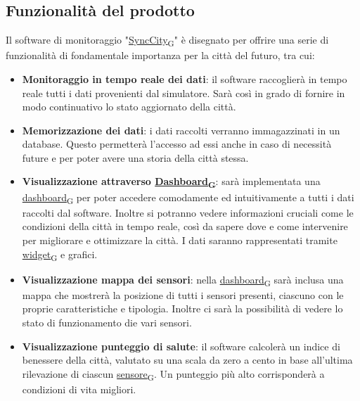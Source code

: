 \subsection{Funzionalità del prodotto}
Il software di monitoraggio "\href{https://7last.github.io/docs/rtb/documentazione-interna/glossario\#synccity}{SyncCity\textsubscript{G}}" è disegnato per offrire una serie di funzionalità di fondamentale importanza per la città del futuro, tra cui:
\begin{itemize}
    \item \textbf{Monitoraggio in tempo reale dei dati}: il software raccoglierà in tempo reale tutti i dati provenienti dal simulatore. Sarà così in grado di fornire in modo continuativo lo stato aggiornato della città. 
    \item \textbf{Memorizzazione dei dati}: i dati raccolti verranno immagazzinati in un database. Questo permetterà l'accesso ad essi anche in caso di necessità future e  per poter avere una storia della città stessa.
    \item \textbf{Visualizzazione attraverso \href{https://7last.github.io/docs/rtb/documentazione-interna/glossario\#dashboard}{Dashboard\textsubscript{G}}}: sarà implementata una \href{https://7last.github.io/docs/rtb/documentazione-interna/glossario\#dashboard}{dashboard\textsubscript{G}} per poter accedere comodamente ed intuitivamente a tutti i dati raccolti dal software. Inoltre si potranno vedere informazioni cruciali come le condizioni della città in tempo reale, così da sapere dove e come intervenire per migliorare e ottimizzare la città. I dati saranno rappresentati tramite \href{https://7last.github.io/docs/rtb/documentazione-interna/glossario\#widget}{widget\textsubscript{G}} e grafici.
    \item \textbf{Visualizzazione mappa dei sensori}: nella \href{https://7last.github.io/docs/rtb/documentazione-interna/glossario\#dashboard}{dashboard\textsubscript{G}} sarà inclusa una mappa che mostrerà la posizione di tutti i sensori presenti, ciascuno con le proprie caratteristiche e tipologia. Inoltre ci sarà la possibilità di vedere lo stato di funzionamento die vari sensori.
    \item \textbf{Visualizzazione punteggio di salute}: il software calcolerà un indice di benessere della città, valutato su una scala da zero a cento in base all'ultima rilevazione di ciascun \href{https://7last.github.io/docs/rtb/documentazione-interna/glossario\#sensore}{sensore\textsubscript{G}}. Un punteggio più alto corrisponderà a condizioni di vita migliori.

\end{itemize}
